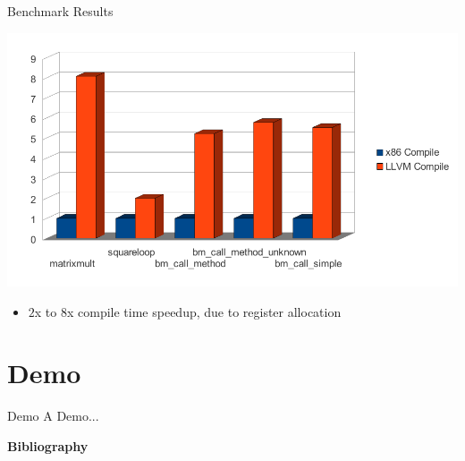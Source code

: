 \documentclass{beamer}
\begin{document}
\begin{frame}{Benchmark Results}
  \begin{center}
    \includegraphics[scale=.63]{./include/pdf/compiletime.pdf}
  \end{center}
  \begin{itemize}
  \item $2$x to $8$x compile time speedup\pause, due to register allocation
  \end{itemize}
\end{frame}

\section{Demo}

\begin{frame}{Demo}
  A Demo...
\end{frame}

\begin{frame}[t,allowframebreaks]{\bf Bibliography}
  \nocite{*}
  \printbibliography
\end{frame}
\end{document}
